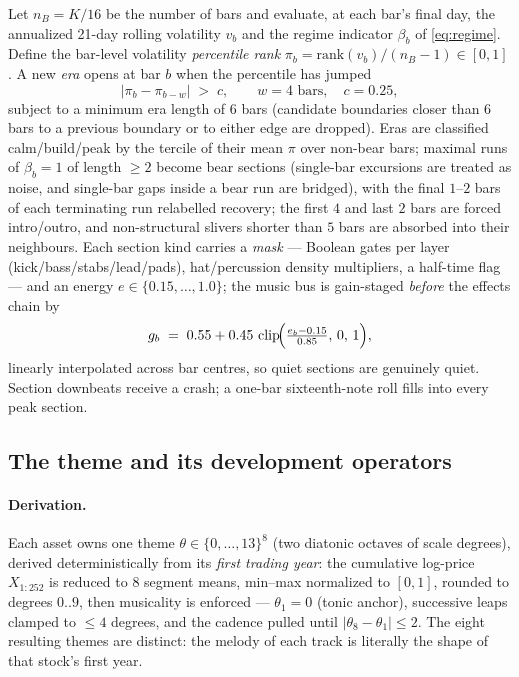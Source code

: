\documentclass[11pt,a4paper]{article}
\begin{document}
Let $n_B = K/16$ be the number of bars and evaluate, at each bar's final
day, the annualized 21-day rolling volatility $v_b$ and the regime
indicator $\beta_b$ of \eqref{eq:regime}. Define the bar-level volatility
\emph{percentile rank} $\pi_b = \mathrm{rank}(v_b)/(n_B-1) \in [0,1]$.
A new \emph{era} opens at bar $b$ when the percentile has jumped
\begin{equation}
\bigl|\pi_b - \pi_{b-w}\bigr| \;>\; c, \qquad w = 4 \text{ bars},\quad c = 0.25,
\label{eq:cp}
\end{equation}
subject to a minimum era length of $6$ bars (candidate boundaries closer
than $6$ bars to a previous boundary or to either edge are dropped). Eras
are classified \textsf{calm}/\textsf{build}/\textsf{peak} by the tercile of
their mean $\pi$ over non-bear bars; maximal runs of $\beta_b=1$ of length
$\ge 2$ become \textsf{bear} sections (single-bar excursions are treated as
noise, and single-bar gaps inside a bear run are bridged), with the final
$1$--$2$ bars of each terminating run relabelled \textsf{recovery}; the
first $4$ and last $2$ bars are forced \textsf{intro}/\textsf{outro}, and
non-structural slivers shorter than $5$ bars are absorbed into their
neighbours. Each section kind carries a \emph{mask} --- Boolean gates per
layer (kick/bass/stabs/lead/pads), hat/percussion density multipliers, a
half-time flag --- and an energy $e \in \{0.15,\dots,1.0\}$; the music bus
is gain-staged \emph{before} the effects chain by
\begin{equation}
g_b \;=\; 0.55 + 0.45\,\operatorname{clip}\!\Bigl(\tfrac{e_b - 0.15}{0.85},\,0,\,1\Bigr),
\end{equation}
linearly interpolated across bar centres, so quiet sections are genuinely
quiet. Section downbeats receive a crash; a one-bar sixteenth-note roll
fills into every \textsf{peak} section.

\subsection{The theme and its development operators}\label{sec:v4motif}

\paragraph{Derivation.} Each asset owns one theme
$\theta \in \{0,\dots,13\}^{8}$ (two diatonic octaves of scale degrees),
derived deterministically from its \emph{first trading year}: the
cumulative log-price $X_{1:252}$ is reduced to $8$ segment means, min--max
normalized to $[0,1]$, rounded to degrees $0..9$, then musicality is
enforced --- $\theta_1 = 0$ (tonic anchor), successive leaps clamped to
$\le 4$ degrees, and the cadence pulled until
$|\theta_8 - \theta_1| \le 2$. The eight resulting themes are distinct: the
melody of each track is literally the shape of that stock's first year.
\end{document}
